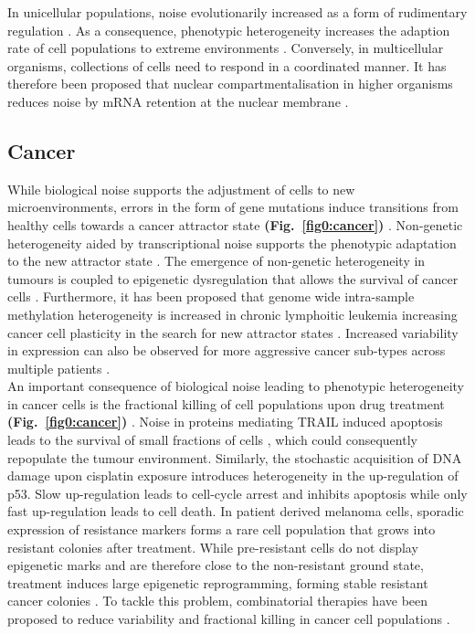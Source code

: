 In unicellular populations, noise evolutionarily increased as a form of rudimentary regulation \citep{Wolf2015}. As a consequence, phenotypic heterogeneity increases the adaption rate of cell populations to extreme environments \cite{Bodi2017}. Conversely, in multicellular organisms, collections of cells need to respond in a coordinated manner. It has therefore been proposed that nuclear compartmentalisation in higher organisms reduces noise by mRNA retention at the nuclear membrane \citep{Battich2013, Stoeger2016}.

\subsection{Cancer}

While biological noise supports the adjustment of cells to new microenvironments, errors in the form of gene mutations induce transitions from healthy cells towards a cancer attractor state \textbf{(Fig.~\ref{fig0:cancer})} \citep{Marusyk2012}. Non-genetic heterogeneity aided by transcriptional noise supports the phenotypic adaptation to the new attractor state \citep{Jia2017}. The emergence of non-genetic heterogeneity in tumours is coupled to epigenetic dysregulation that allows the survival of cancer cells \citep{Timp2013}. Furthermore, it has been proposed that genome wide intra-sample methylation heterogeneity is increased in chronic lymphoitic leukemia increasing cancer cell plasticity in the search for new attractor states \citep{Landau2014}. Increased variability in expression can also be observed for more aggressive cancer sub-types across multiple patients \citep{Ecker2015}. \\

An important consequence of biological noise leading to phenotypic heterogeneity in cancer cells is the fractional killing of cell populations upon drug treatment \textbf{(Fig.~\ref{fig0:cancer})} \citep{Flusberg2015}. Noise in proteins mediating \Gls{TRAIL} induced apoptosis leads to the survival of small fractions of cells \citep{Spencer2009}, which could consequently repopulate the tumour environment. Similarly, the stochastic acquisition of DNA damage upon cisplatin exposure introduces heterogeneity in the up-regulation of p53. Slow up-regulation leads to cell-cycle arrest and inhibits apoptosis while only fast up-regulation leads to cell death. In patient derived melanoma cells, sporadic expression of resistance markers forms a rare cell population that grows into resistant colonies after treatment. While pre-resistant cells do not display epigenetic marks and are therefore close to the non-resistant ground state, treatment induces large epigenetic reprogramming, forming stable resistant cancer colonies \citep{Shaffer2017}. To tackle this problem, combinatorial therapies have been proposed to reduce variability and fractional killing in cancer cell populations \cite{Paek2016, Roux2015}.\\

